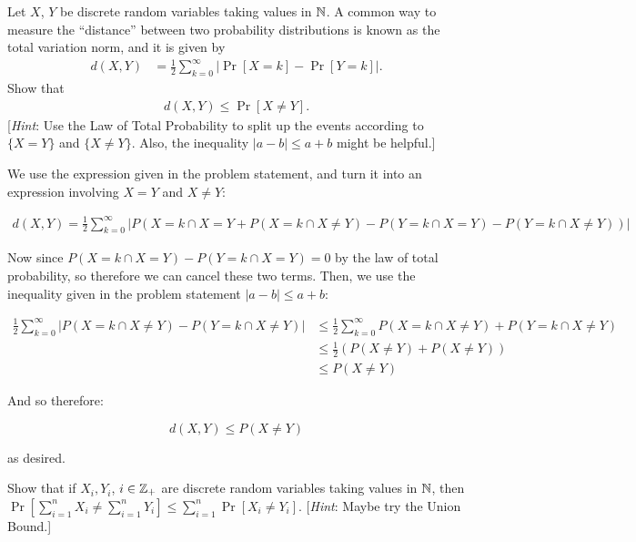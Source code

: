 \documentclass[11pt]{article}
\begin{document}
\begin{Parts}
    \Part Let $X$, $Y$ be discrete random variables taking values in $\mathbb{N}$.
    A common way to measure the ``distance'' between two probability distributions is known as the total variation norm, and it is given by
    \begin{align*}
        d(X, Y) &= \frac{1}{2} \sum_{k=0}^\infty |\Pr[X = k] - \Pr[Y = k]|.
    \end{align*}
    Show that
    \begin{align} \label{eq:metric-bound}
        d(X, Y) \leq \Pr[X \neq Y].
    \end{align}
    [\textit{Hint}: Use the Law of Total Probability to split up the events according to $\{X = Y\}$ and $\{X \neq Y\}$. Also, the inequality $|a - b| \leq a + b$ might be helpful.]


    \begin{solution}
        We use the expression given in the problem statement, and turn it into an expression involving $X = Y$ and $X \neq Y$:


        \begin{align*}
            d(X, Y)= \frac 12 \sum_{k = 0}^\infty |P(X = k \cap X = Y + P(X = k \cap X \neq Y) - P(Y = k \cap X = Y) - P(Y= k \cap X \neq Y))|
        \end{align*}

        Now since $P(X = k \cap X = Y) - P(Y = k \cap X = Y) = 0$ by the law of total probability, so therefore we can cancel these two terms. Then, we use the inequality given in the problem statement $|a - b| \le a + b$: 

        \begin{align*}
            \frac 12 \sum_{k = 0}^\infty |P(X = k \cap X \neq Y) - P(Y = k \cap X \neq Y)| &\le \frac{1}{2} \sum_{k = 0}^\infty P(X = k \cap X \neq Y) + P(Y = k \cap X \neq Y)\\
            &\le  \frac 12\left( P(X \neq Y) + P(X \neq Y)\right)\\
            & \le P(X \neq Y)
        \end{align*}

        And so therefore: 

        \[ d(X, Y) \le P(X \neq Y) \]

        as desired.
    \end{solution}
    \Part Show that if $X_i, Y_i$, $i \in \mathbb{Z}_+$ are discrete random variables taking values in $\mathbb{N}$, then $\Pr[\sum_{i=1}^n X_i \neq \sum_{i=1}^n Y_i] \leq \sum_{i=1}^n \Pr[X_i \neq Y_i]$.
    [\textit{Hint}: Maybe try the Union Bound.]


\end{Parts}
\end{document}
